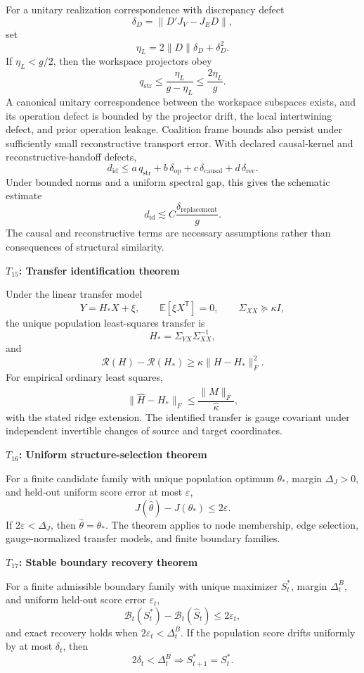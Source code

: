 \documentclass[11pt,letterpaper]{article}
\newcommand{\subtopic}[1]{%
 \vspace{0.45em}
 {\bfseries\color{AccentColor} #1\par}
}
\theoremstyle{plain}
\theoremstyle{definition}
\begin{document}
For a unitary realization correspondence with discrepancy defect
\[
\delta_D=\|D'J_V-J_ED\|,
\]
set
\[
\eta_L=2\|D\|\delta_D+\delta_D^2.
\]
If \(\eta_L<g/2\), then the workspace projectors obey
\[
\boxed{
q_{\mathrm{str}}
\leq
\frac{\eta_L}{g-\eta_L}
\leq
\frac{2\eta_L}{g}.
}
\]
A canonical unitary correspondence between the workspace subspaces exists,
and its operation defect is bounded by the projector drift, the local
intertwining defect, and prior operation leakage. Coalition frame bounds also
persist under sufficiently small reconstructive transport error. With declared
causal-kernel and reconstructive-handoff defects,
\[
\boxed{
d_{\mathrm{id}}
\leq
 a\,q_{\mathrm{str}}
+b\,\delta_{\mathrm{op}}
+c\,\delta_{\mathrm{causal}}
+d\,\delta_{\mathrm{rec}}.
}
\]
Under bounded norms and a uniform spectral gap, this gives the schematic
estimate
\[
d_{\mathrm{id}}
\lesssim
C\frac{\delta_{\mathrm{replacement}}}{g}.
\]
The causal and reconstructive terms are necessary assumptions rather than
consequences of structural similarity.


\subtopic{\(T_{15}\): Transfer identification theorem }

Under the linear transfer model
\[
Y=H_*X+\xi,
\qquad
\mathbb E[\xi X^{\mathsf T}]=0,
\qquad
\Sigma_{XX}\succeq\kappa I,
\]
the unique population least-squares transfer is
\[
\boxed{H_*=\Sigma_{YX}\Sigma_{XX}^{-1},}
\]
and
\[
\mathcal R(H)-\mathcal R(H_*)
\geq
\kappa\|H-H_*\|_F^2.
\]
For empirical ordinary least squares,
\[
\|\widehat H-H_*\|_F
\leq
\frac{\|\widehat M\|_F}{\widehat\kappa},
\]
with the stated ridge extension. The identified transfer is gauge covariant
under independent invertible changes of source and target coordinates.

\subtopic{\(T_{16}\): Uniform structure-selection theorem }

For a finite candidate family with unique population optimum \(\theta_*\),
margin \(\Delta_J>0\), and held-out uniform score error at most \(\varepsilon\),
\[
\boxed{
J(\widehat\theta)-J(\theta_*)\leq2\varepsilon.
}
\]
If \(2\varepsilon<\Delta_J\), then \(\widehat\theta=\theta_*\). The theorem
applies to node membership, edge selection, gauge-normalized transfer models,
and finite boundary families.

\subtopic{\(T_{17}\): Stable boundary recovery theorem }

For a finite admissible boundary family with unique maximizer \(S_t^*\), margin
\(\Delta_t^B\), and uniform held-out score error \(\varepsilon_t\),
\[
\mathcal B_t(S_t^*)-
\mathcal B_t(\widehat S_t)
\leq2\varepsilon_t,
\]
and exact recovery holds when \(2\varepsilon_t<\Delta_t^B\). If the population
score drifts uniformly by at most \(\delta_t\), then
\[
2\delta_t<\Delta_t^B
\Longrightarrow
S_{t+1}^*=S_t^*.
\]
\end{document}
